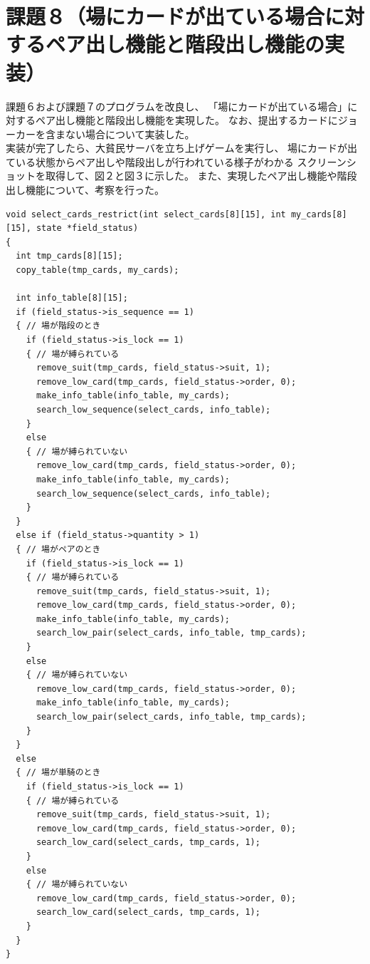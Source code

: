 \documentclass[]{jsarticle}
\begin{document}
\newpage
\section{課題８（場にカードが出ている場合に対するペア出し機能と階段出し機能の実装）}
課題６および課題７のプログラムを改良し、 「場にカードが出ている場合」に対するペア出し機能と階段出し機能を実現した。
なお、提出するカードにジョーカーを含まない場合について実装した。\\

実装が完了したら、大貧民サーバを立ち上げゲームを実行し、 場にカードが出ている状態からペア出しや階段出しが行われている様子がわかる
スクリーンショットを取得して、図２と図３に示した。
また、実現したペア出し機能や階段出し機能について、考察を行った。\\

\begin{lstlisting}[caption={select\_cards.c}]
  void select_cards_restrict(int select_cards[8][15], int my_cards[8][15], state *field_status)
{
  int tmp_cards[8][15];
  copy_table(tmp_cards, my_cards);

  int info_table[8][15];
  if (field_status->is_sequence == 1)
  { // 場が階段のとき
    if (field_status->is_lock == 1)
    { // 場が縛られている
      remove_suit(tmp_cards, field_status->suit, 1);
      remove_low_card(tmp_cards, field_status->order, 0);
      make_info_table(info_table, my_cards);
      search_low_sequence(select_cards, info_table);
    }
    else
    { // 場が縛られていない
      remove_low_card(tmp_cards, field_status->order, 0);
      make_info_table(info_table, my_cards);
      search_low_sequence(select_cards, info_table);
    }
  }
  else if (field_status->quantity > 1)
  { // 場がペアのとき
    if (field_status->is_lock == 1)
    { // 場が縛られている
      remove_suit(tmp_cards, field_status->suit, 1);
      remove_low_card(tmp_cards, field_status->order, 0);
      make_info_table(info_table, my_cards);
      search_low_pair(select_cards, info_table, tmp_cards);
    }
    else
    { // 場が縛られていない
      remove_low_card(tmp_cards, field_status->order, 0);
      make_info_table(info_table, my_cards);
      search_low_pair(select_cards, info_table, tmp_cards);
    }
  }
  else
  { // 場が単騎のとき
    if (field_status->is_lock == 1)
    { // 場が縛られている
      remove_suit(tmp_cards, field_status->suit, 1);
      remove_low_card(tmp_cards, field_status->order, 0);
      search_low_card(select_cards, tmp_cards, 1);
    }
    else
    { // 場が縛られていない
      remove_low_card(tmp_cards, field_status->order, 0);
      search_low_card(select_cards, tmp_cards, 1);
    }
  }
}
\end{lstlisting}
\end{document}
